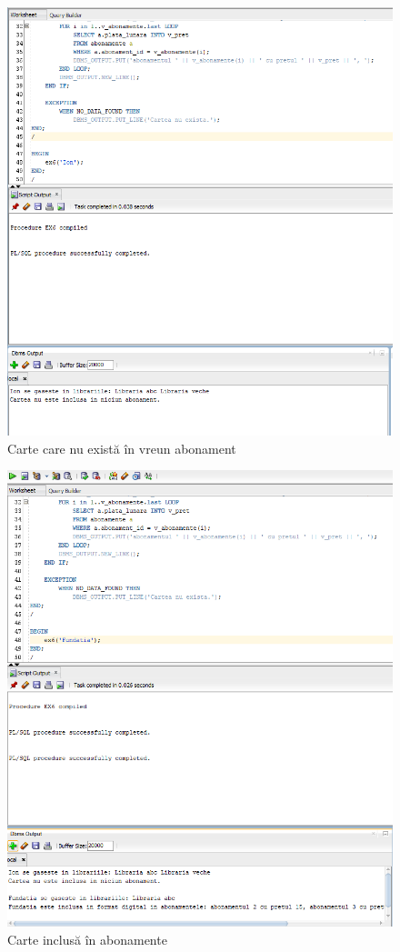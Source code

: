 \documentclass[12pt]{article}
\begin{document}
\begin{figure}[!htb]
	\includegraphics[max width=\linewidth]{imgs/ex6_1.png}
	\caption{Carte care nu există în vreun abonament}
	\label{fig:ex6_1}
\end{figure}
\begin{figure}[!htb]
\includegraphics[max width=\linewidth]{imgs/ex6_2.png}
\caption{Carte inclusă în abonamente}
\label{fig:ex6_2}
\end{figure}
\end{document}
